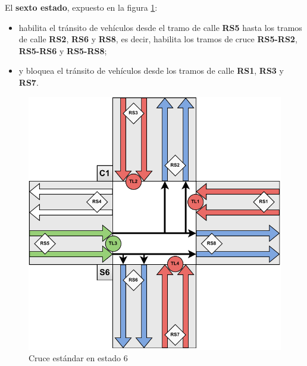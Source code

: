 \newpage
El \textbf{sexto estado}, expuesto en la figura \ref{fig:cruce_estandar_estado_6}:
\begin{itemize}
    \item habilita el tránsito de vehículos desde el tramo de calle \textbf{RS5} hasta los tramos de calle \textbf{RS2}, \textbf{RS6} y \textbf{RS8}, es decir, habilita los tramos de cruce \textbf{RS5-RS2}, \textbf{RS5-RS6} y \textbf{RS5-RS8};
    \item y bloquea el tránsito de vehículos desde los tramos de calle \textbf{RS1}, \textbf{RS3} y \textbf{RS7}.
\end{itemize}
\begin{figure}[H]
    \centering
    \includegraphics[width=1\linewidth]{text/image/DCruc-CE-Estado6.pdf}
    \caption{Cruce estándar en estado 6}
    \label{fig:cruce_estandar_estado_6}
\end{figure}


\newpage

